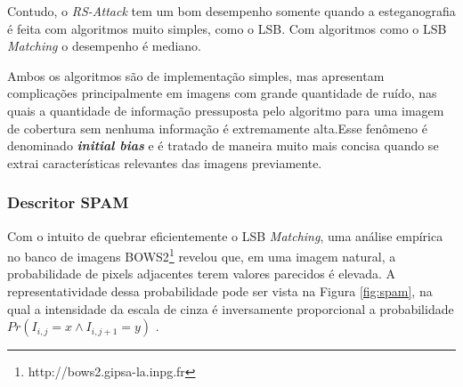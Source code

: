 


Contudo, o \textit{RS-Attack} tem um bom desempenho somente quando a esteganografia é feita com algoritmos muito simples, como o LSB. Com algoritmos como o LSB \textit{Matching} o desempenho é mediano.

Ambos os algoritmos são de implementação simples, mas apresentam complicações principalmente em imagens com grande quantidade de ruído, nas quais a quantidade de informação pressuposta pelo algoritmo para uma imagem de cobertura sem nenhuma informação é extremamente alta.Esse fenômeno é denominado \textbf{\textit{initial bias}} e é tratado de maneira muito mais concisa quando se extrai características relevantes das imagens previamente.

\subsubsection{Descritor SPAM}
\label{subsec:spam}

Com o intuito de quebrar eficientemente
o LSB \textit{Matching}, uma análise empírica no banco de imagens BOWS2\footnote{http://bows2.gipsa-la.inpg.fr}
revelou que, em uma imagem natural, a probabilidade de pixels adjacentes terem valores parecidos é elevada. A representatividade dessa probabilidade pode ser vista na Figura \ref{fig:spam}, 
na qual a intensidade da escala de cinza é inversamente proporcional a probabilidade $Pr(I_{i,j} = x \wedge I_{i, j+1} = y)$ \cite{spam}.

